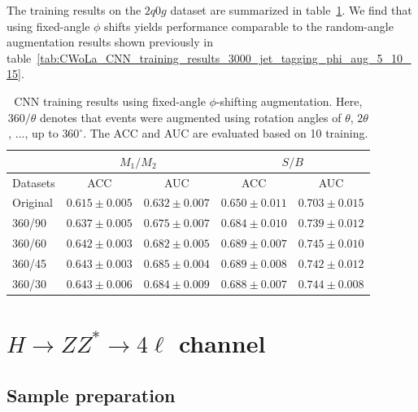 \documentclass[12pt]{article}
\begin{document}
    The training results on the $2q0g$ dataset are summarized in table~\ref{tab:CWoLa_CNN_training_results_3000_jet_tagging_phi_aug_fix_30_45_60_90}. We find that using fixed-angle $\phi$ shifts yields performance comparable to the random-angle augmentation results shown previously in table~\ref{tab:CWoLa_CNN_training_results_3000_jet_tagging_phi_aug_5_10_15}.
    \begin{table}[htpb]
        \centering
        \caption{CNN training results using fixed-angle $\phi$-shifting augmentation. Here, $360/\theta$ denotes that events were augmented using rotation angles of $\theta$, $2\theta$, ..., up to $360^\circ$. The ACC and AUC are evaluated based on 10 training.}
        \label{tab:CWoLa_CNN_training_results_3000_jet_tagging_phi_aug_fix_30_45_60_90}
        \begin{tabular}{l|cc|cc}
                     & \multicolumn{2}{c|}{$M_1 / M_2$}      & \multicolumn{2}{c}{$S / B$}           \\ \hline
            Datasets & ACC               & AUC               & ACC               & AUC               \\ \hline
            Original & $0.615 \pm 0.005$ & $0.632 \pm 0.007$ & $0.650 \pm 0.011$ & $0.703 \pm 0.015$ \\
            360/90   & $0.637 \pm 0.005$ & $0.675 \pm 0.007$ & $0.684 \pm 0.010$ & $0.739 \pm 0.012$ \\
            360/60   & $0.642 \pm 0.003$ & $0.682 \pm 0.005$ & $0.689 \pm 0.007$ & $0.745 \pm 0.010$ \\
            360/45   & $0.643 \pm 0.003$ & $0.685 \pm 0.004$ & $0.689 \pm 0.008$ & $0.742 \pm 0.012$ \\
            360/30   & $0.643 \pm 0.006$ & $0.684 \pm 0.009$ & $0.688 \pm 0.007$ & $0.744 \pm 0.008$
        \end{tabular}
    \end{table}


\section{\texorpdfstring{$H \to ZZ^* \to 4\ell$}{H to ZZ to 4l} channel}%
\label{sec:h_to_zz_to_4l_channel}
    
    \subsection{Sample preparation}%
    \label{sub:sample_preparation}
        
\end{document}
